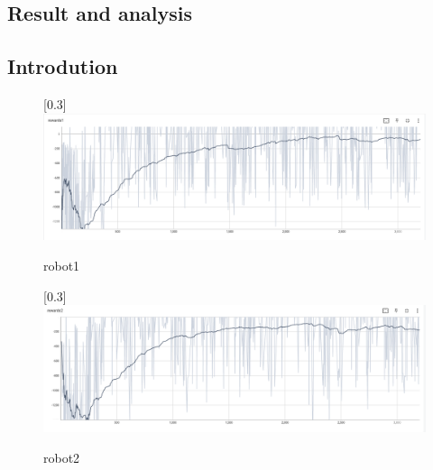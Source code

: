 \documentclass[12pt]{extarticle}
\begin{document}
\afterpage{\clearpage}





\newpage
\pagebreak
\hspace{0pt}
\vfill
\begin{center}
\section{Result and analysis}
\end{center}
\vfill
\hspace{0pt}

\pagebreak

\subsection{Introdution}
\begin{figure}[h]  
\begin{center}
\scalebox{0.3}[0.3]{
\includegraphics{robot1}
}

\caption[robot1]{robot1}

\end{center}

\end{figure}
\begin{figure}[h]  
\begin{center}
\scalebox{0.3}[0.3]{
\includegraphics{robot2}
}

\caption[robot2]{robot2}

\end{center}

\end{figure}
\end{document}
